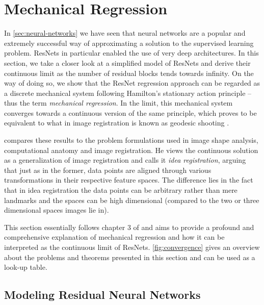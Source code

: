 \section{Mechanical Regression}
\label{sec:mechanical-regression}

In \cref{sec:neural-networks} we have seen that neural networks are a popular and extremely successful way of approximating a solution to the supervised learning problem.
ResNets in particular enabled the use of very deep architectures.
In this section, we take a closer look at a simplified model of ResNets and derive their continuous limit as the number of residual blocks tends towards infinity.
On the way of doing so, we show that the ResNet regression approach can be regarded as a discrete mechanical system following Hamilton's stationary action principle -- thus the term \emph{mechanical regression}.
In the limit, this mechanical system converges towards a continuous version of the same principle, which proves to be equivalent to what in image registration is known as geodesic shooting \cite{allassonniere05}.

\citet{owhadi20} compares these results to the problem formulations used in image shape analysis, computational anatomy and image registration.
He views the continuous solution as a generalization of image registration and calls it \emph{idea registration}, arguing that just as in the former, data points are aligned through various transformations in their respective feature spaces.
The difference lies in the fact that in idea registration the data points can be arbitrary rather than mere landmarks and the spaces can be high dimensional (compared to the two or three dimensional spaces images lie in).

This section essentially follows chapter 3 of \cite{owhadi20} and aims to provide a profound and comprehensive explanation of mechanical regression and how it can be interpreted as the continuous limit of ResNets.
\cref{fig:convergence} gives an overview about the problems and theorems presented in this section and can be used as a look-up table.

\subsection{Modeling Residual Neural Networks}

